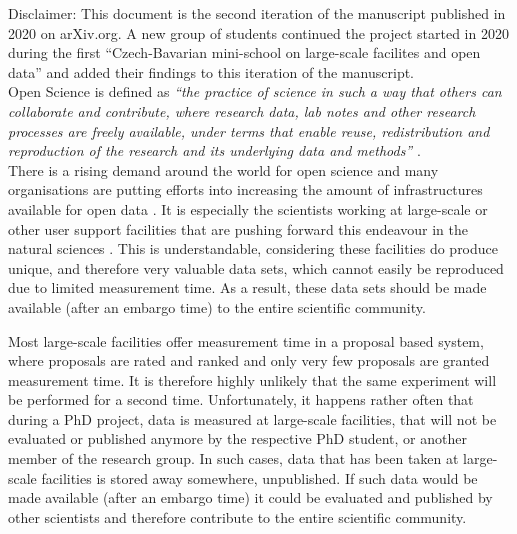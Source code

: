 \documentclass[aps,pra,reprint,amsmath,amssymb,superscriptaddress,showkeys]{revtex4-1}
\begin{document}
Disclaimer: This document is the second iteration of the manuscript published in 2020 on arXiv.org\cite{minischool2020}.
A new group of students continued the project started in 2020 during the first ``Czech-Bavarian mini-school on large-scale facilites and open data'' and added their findings to this iteration of the manuscript.\\

Open Science is defined as \emph{``the practice of science in such a way that others can collaborate and contribute, where research data, lab notes and other research processes are freely available, under terms that enable reuse, redistribution and reproduction of the research and its underlying data and methods''} \cite{foster}.\\

There is a rising demand around the world for open science and many organisations are putting efforts into increasing the amount of infrastructures available for open data \cite{Bilbao, NIST, plos, sharing, panosc, nfdi, expands}. 
It is especially the scientists working at large-scale or other user support facilities that are pushing forward this endeavour in the natural sciences \cite{panosc, nfdi, expands}.
This is understandable, considering these facilities do produce unique, and therefore very valuable data sets, which cannot easily be reproduced due to limited measurement time. As a result, these data sets should be made available (after an embargo time) to the entire scientific community. 

Most large-scale facilities offer measurement time in a proposal based system, where proposals are rated and ranked and only very few proposals are granted measurement time.
It is therefore highly unlikely that the same experiment will be performed for a second time. 
Unfortunately, it happens rather often that during a PhD project, data is measured at large-scale facilities, that will not be evaluated or published anymore by the respective PhD student, or another member of the research group.
In such cases, data that has been taken at large-scale facilities is stored away somewhere, unpublished.
If such data would be made available (after an embargo time) it could be evaluated and published by other scientists and therefore contribute to the entire scientific community.
\end{document}
